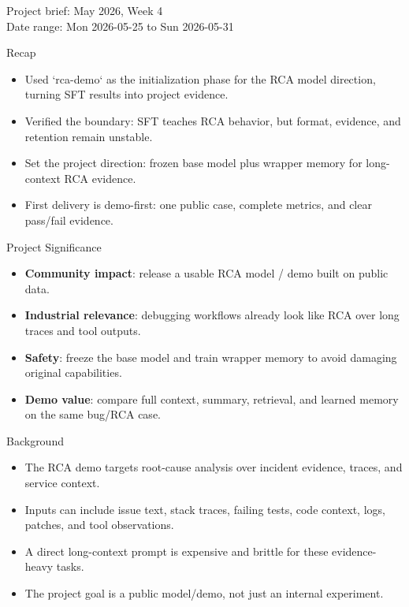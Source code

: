 
\begin{frame}
  \titlepage
  \vspace{-1.0em}
  \begin{center}
    \small Project brief: May 2026, Week 4 \\
    \scriptsize Date range: Mon 2026-05-25 to Sun 2026-05-31
  \end{center}
\end{frame}

\begin{frame}{Recap}
  \begin{itemize}
    \item Used `rca-demo` as the initialization phase for the RCA model direction, turning SFT results into project evidence.
    \item Verified the boundary: SFT teaches RCA behavior, but format, evidence, and retention remain unstable.
    \item Set the project direction: frozen base model plus wrapper memory for long-context RCA evidence.
    \item First delivery is demo-first: one public case, complete metrics, and clear pass/fail evidence.
  \end{itemize}
\end{frame}

\begin{frame}{Project Significance}
  \begin{itemize}
    \item \textbf{Community impact}: release a usable RCA model / demo built on public data.
    \item \textbf{Industrial relevance}: debugging workflows already look like RCA over long traces and tool outputs.
    \item \textbf{Safety}: freeze the base model and train wrapper memory to avoid damaging original capabilities.
    \item \textbf{Demo value}: compare full context, summary, retrieval, and learned memory on the same bug/RCA case.
  \end{itemize}
\end{frame}

\begin{frame}{Background}
  \begin{itemize}
    \item The RCA demo targets root-cause analysis over incident evidence, traces, and service context.
    \item Inputs can include issue text, stack traces, failing tests, code context, logs, patches, and tool observations.
    \item A direct long-context prompt is expensive and brittle for these evidence-heavy tasks.
    \item The project goal is a public model/demo, not just an internal experiment.
  \end{itemize}
\end{frame}

